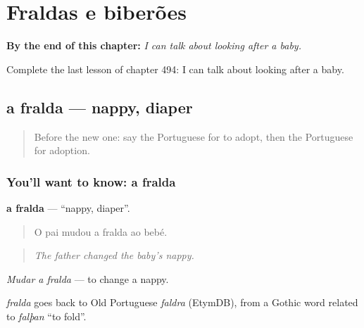 
\chapter{Fraldas e biberões}
\label{ch:pt-fraldas-e-biberoes}

\begin{chapteropening}
\textbf{By the end of this chapter:} \emph{I can talk about looking after a baby.}

Complete the last lesson of chapter 494: I can talk about looking after a baby.
\end{chapteropening}

\section[a fralda]{a fralda — nappy, diaper}

\label{lesson:PT-C494-fralda}



\begin{quote}
Before the new one: say the Portuguese for to adopt, then the Portuguese for adoption.
\end{quote}

\subsection*{You'll want to know: a fralda}
\textbf{a fralda} — \textquotedblleft{}nappy, diaper\textquotedblright{}.

\begin{quote}
O pai mudou a fralda ao bebé.
\end{quote}

\begin{quote}
\emph{The father changed the baby's nappy.}
\end{quote}

\emph{Mudar a fralda} — to change a nappy.

\begin{cousinweb}
\emph{fralda} goes back to Old Portuguese \emph{faldra} (EtymDB), from a Gothic word related to \emph{falþan} \textquotedblleft{}to fold\textquotedblright{}.
\end{cousinweb}

